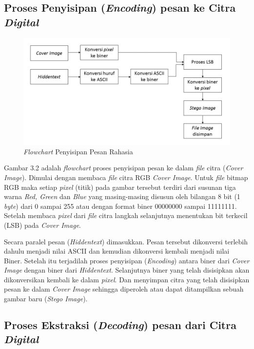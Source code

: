 	\subsection{Proses Penyisipan (\emph{Encoding}) pesan ke Citra \emph{Digital}}
	
	\begin{figure}[H]
		\centering
		\includegraphics[width=1\textwidth]{gambar/penyisipan2}
		\caption{\emph{Flowchart} Penyisipan Pesan Rahasia}
		\label{flowchart_penyisipan}
	\end{figure}

	Gambar 3.2 adalah \emph{flowchart} proses penyisipan pesan ke dalam \emph{file}
	citra (\emph{Cover Image}). Dimulai dengan membaca \emph{file} citra RGB \emph{Cover Image}. Untuk \emph{file} bitmap RGB maka setiap \emph{pixel} (titik) pada gambar tersebut terdiri dari susunan tiga warna \emph{Red, Green} dan \emph{Blue} yang masing-masing disusun oleh bilangan 8 bit (1 \emph{byte}) dari 0 sampai 255 atau dengan format biner 00000000 sampai 11111111. Setelah membaca \emph{pixel} dari \emph{file} citra langkah selanjutnya menentukan bit terkecil (LSB) pada \emph{Cover Image}.
	
	Secara paralel pesan (\emph{Hiddentext}) dimasukkan. Pesan tersebut dikonversi terlebih dahulu menjadi nilai ASCII dan kemudian dikonversi kembali menjadi nilai Biner. Setelah itu terjadilah proses penyisipan (\emph{Encoding}) antara biner dari \emph{Cover Image} dengan biner dari \emph{Hiddentext}. Selanjutnya biner yang telah disisipkan akan dikonversikan kembali ke dalam \emph{pixel}. Dan menyimpan citra yang telah disisipkan pesan ke dalam \emph{Cover Image} sehingga diperoleh atau	dapat ditampilkan sebuah gambar baru (\emph{Stego Image}).
	
	\subsection{Proses Ekstraksi (\emph{Decoding}) pesan dari Citra \emph{Digital}}
	
